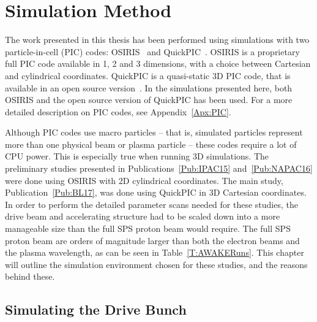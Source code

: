 %
%

\chapter{Simulation Method}
\label{Ch:SimS}

The work presented in this thesis has been performed using simulations with two particle-in-cell (PIC) codes:
OSIRIS~\cite{fonseca:2002} and QuickPIC~\cite{an:2013, huang:2006}.
OSIRIS is a proprietary full PIC code available in 1, 2 and 3 dimensions, with a choice between Cartesian and cylindrical coordinates.
QuickPIC is a quasi-static 3D PIC code, that is available in an open source version~\cite{add:quickpic:web}.
In the simulations presented here, both OSIRIS and the open source version of QuickPIC has been used.
For a more detailed description on PIC codes, see Appendix~\ref{Apx:PIC}.

Although PIC codes use macro particles -- that is, simulated particles represent more than one physical beam or plasma particle -- these codes require a lot of CPU power.
This is especially true when running 3D simulations.
The preliminary studies presented in Publications~\ref{Pub:IPAC15} and~\ref{Pub:NAPAC16} were done using OSIRIS with 2D cylindrical coordinates.
The main study, Publication~\ref{Pub:BL17}, was done using QuickPIC in 3D Cartesian coordinates.
In order to perform the detailed parameter scans needed for these studies, the drive beam and accelerating structure had to be scaled down into a more manageable size than the full SPS proton beam would require.
The full SPS proton beam are orders of magnitude larger than both the electron beams and the plasma wavelength, as can be seen in Table~\ref{T:AWAKERuns}.
This chapter will outline the simulation environment chosen for these studies, and the reasons behind these.

\section{Simulating the Drive Bunch}
\label{Sim:PBeam}

